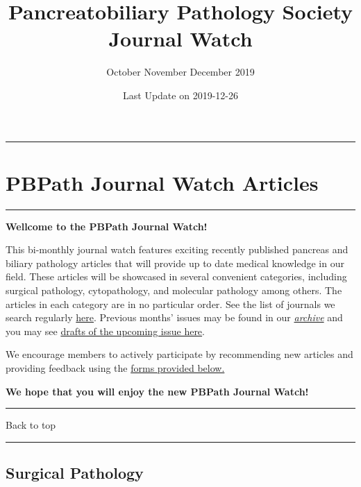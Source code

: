 \documentclass[
]{article}
\title{Pancreatobiliary Pathology Society Journal Watch}
\subtitle{October November December 2019}
\author{}
\date{\vspace{-2.5em}Last Update on 2019-12-26}
\renewcommand{\linethickness}{0.05em}
\begin{document}
\maketitle

{
\setcounter{tocdepth}{5}
\tableofcontents
}
\begin{center}\rule{0.5\linewidth}{\linethickness}\end{center}

\hypertarget{pbpath_jw}{%
\section{PBPath Journal Watch Articles}\label{pbpath_jw}}

\begin{center}\rule{0.5\linewidth}{\linethickness}\end{center}

\textbf{Wellcome to the PBPath Journal Watch!}

This bi-monthly journal watch features exciting recently published
pancreas and biliary pathology articles that will provide up to date
medical knowledge in our field. These articles will be showcased in
several convenient categories, including surgical pathology,
cytopathology, and molecular pathology among others. The articles in
each category are in no particular order. See the list of journals we
search regularly \href{http://pbpath.org/pbpath-journal-watch/}{here}.
Previous months' issues may be found in our
\emph{\href{http://pbpath.org/journal-watch-archive/}{archive}} and you
may see \href{http://pbpath.org/journal-watch-upcoming-issue/}{drafts of
the upcoming issue here}.

We encourage members to actively participate by recommending new
articles and providing feedback using the
\protect\hyperlink{feedback}{forms provided below.}

\textbf{We hope that you will enjoy the new PBPath Journal Watch!}

\begin{center}\rule{0.5\linewidth}{\linethickness}\end{center}

Back to top

\begin{center}\rule{0.5\linewidth}{\linethickness}\end{center}

\pagebreak

\hypertarget{surgical_pathology}{%
\subsection{Surgical Pathology}\label{surgical_pathology}}
\end{document}

